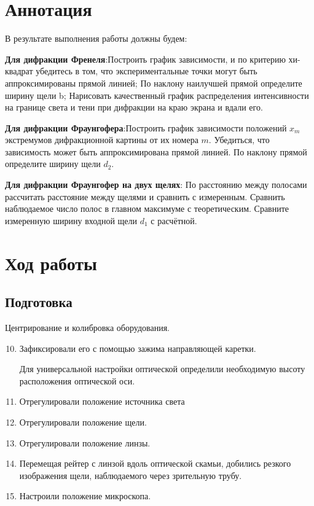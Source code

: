 \documentclass[a4paper]{article}
\begin{document}
\section{Аннотация}

В результате выполнения работы должны будем: \par

\textbf{Для дифракции Френеля}:Построить график зависимости, и по критерию хи-квадрат убедитесь в том, что 
экспериментальные точки могут быть аппроксимированы прямой линией;  По наклону 
наилучшей прямой определите ширину щели b; Нарисовать качественный график распределения интенсивности на границе света и 
тени при дифракции на краю экрана и вдали его.\par

\textbf{Для дифракции Фраунгофера}:Построить график зависимости положений $x_m$ экстремумов дифракционной картины от их номера $m$. Убедиться, что зависимость может быть аппроксимирована прямой линией. По наклону прямой определите ширину щели $d_2$.

\par

\textbf{Для дифракции Фраунгофер на двух щелях}:
По расстоянию между полосами рассчитать расстояние между щелями и сравнить с измеренным.
Сравнить наблюдаемое число полос в главном максимуме с теоретическим.
Сравните измеренную ширину входной щели $d_1$ с расчётной.
\newpage

\section{Ход работы}

\subsection{Подготовка}

Центрирование и колибровка оборудования.


\begin{enumerate}
    \setcounter{enumi}{9}
    
    \item[1] Зафиксировали его с помощью зажима направляющей каретки.
    
    Для универсальной настройки оптической определили необходимую высоту расположения оптической оси.
    
    \item[2] Отрегулировали положение источника света
    
    \item[3] Отрегулировали положение щели.
    
    \item[4] Отрегулировали положение линзы.
    
    \item[5] 
    
    Перемещая рейтер с линзой вдоль оптической скамьи, добились резкого изображения щели, наблюдаемого через зрительную трубу.
    
    \item[6] Настроили положение микроскопа.
    
\end{enumerate}
\end{document}
